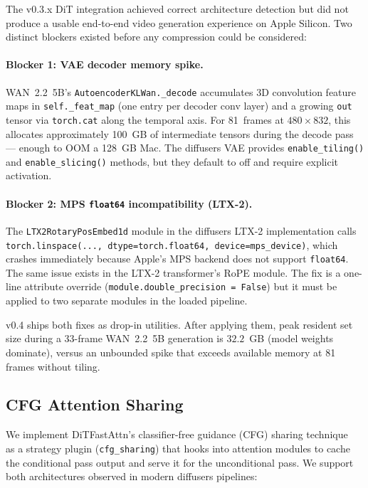 \documentclass[11pt,a4paper]{article}
\begin{document}
The v0.3.x DiT integration achieved correct architecture detection but did not produce a usable end-to-end video generation experience on Apple Silicon. Two distinct blockers existed before any compression could be considered:

\paragraph{Blocker 1: VAE decoder memory spike.} WAN~2.2~5B's \texttt{AutoencoderKLWan.\_decode} accumulates 3D convolution feature maps in \texttt{self.\_feat\_map} (one entry per decoder conv layer) and a growing \texttt{out} tensor via \texttt{torch.cat} along the temporal axis. For 81~frames at $480 \times 832$, this allocates approximately 100~GB of intermediate tensors during the decode pass --- enough to OOM a 128~GB Mac. The diffusers VAE provides \texttt{enable\_tiling()} and \texttt{enable\_slicing()} methods, but they default to off and require explicit activation.

\paragraph{Blocker 2: MPS \texttt{float64} incompatibility (LTX-2).} The \texttt{LTX2RotaryPosEmbed1d} module in the diffusers LTX-2 implementation calls \texttt{torch.linspace(..., dtype=torch.float64, device=mps\_device)}, which crashes immediately because Apple's MPS backend does not support \texttt{float64}. The same issue exists in the LTX-2 transformer's RoPE module. The fix is a one-line attribute override (\texttt{module.double\_precision = False}) but it must be applied to two separate modules in the loaded pipeline.

v0.4 ships both fixes as drop-in utilities. After applying them, peak resident set size during a 33-frame WAN~2.2~5B generation is $32.2$~GB (model weights dominate), versus an unbounded spike that exceeds available memory at 81 frames without tiling.

\subsection{CFG Attention Sharing}

We implement DiTFastAttn's classifier-free guidance (CFG) sharing technique~\cite{yuan2024ditfastattn} as a strategy plugin (\texttt{cfg\_sharing}) that hooks into attention modules to cache the conditional pass output and serve it for the unconditional pass. We support both architectures observed in modern diffusers pipelines:
\end{document}
